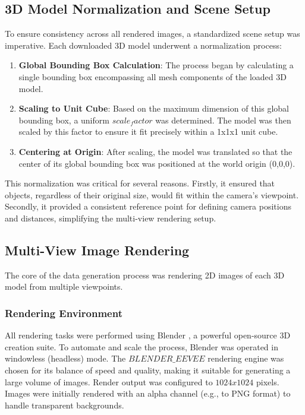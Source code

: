 \subsection{3D Model Normalization and Scene Setup}\label{ssec:model-normalization}
To ensure consistency across all rendered images, a standardized scene setup was imperative. Each downloaded 3D model underwent a normalization process:
\begin{enumerate}
  \item \textbf{Global Bounding Box Calculation}: The process began by calculating a single bounding box encompassing all mesh components of the loaded 3D model.
  \item \textbf{Scaling to Unit Cube}: Based on the maximum dimension of this global bounding box, a uniform $scale_factor$ was determined. The model was then scaled by this factor to ensure it fit precisely within a 1x1x1 unit cube.
  \item \textbf{Centering at Origin}: After scaling, the model was translated so that the center of its global bounding box was positioned at the world origin (0,0,0).
\end{enumerate}
This normalization was critical for several reasons. Firstly, it ensured that objects, regardless of their original size, would fit within the camera's viewpoint. Secondly, it provided a consistent reference point for defining camera positions and distances, simplifying the multi-view rendering setup.

\subsection{Multi-View Image Rendering}\label{ssec:multi-view-rendering}
The core of the data generation process was rendering 2D images of each 3D model from multiple viewpoints.

\subsubsection{Rendering Environment}\label{sssec:rendering-environment}
All rendering tasks were performed using Blender \cite{blender}, a powerful open-source 3D creation suite. To automate and scale the process, Blender was operated in windowless (headless) mode. The $BLENDER\_EEVEE$ rendering engine was chosen for its balance of speed and quality, making it suitable for generating a large volume of images. Render output was configured to $1024x1024$ pixels. Images were initially rendered with an alpha channel (e.g., to PNG format) to handle transparent backgrounds.

